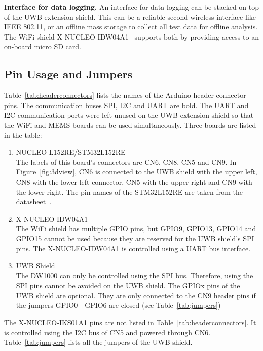 \documentclass[journal,comsoc]{IEEEtran}
\begin{document}
\vspace*{0.5em}
\noindent\textbf{Interface for data logging.} An interface for data logging can be stacked on top of the UWB extension shield. 
This can be a reliable second wireless interface like IEEE 802.11, or an offline mass storage to collect all test data for offline analysis. 
The WiFi shield X-NUCLEO-IDW04A1~\cite{wifiboard} supports both by providing access to an on-board micro SD card. 


\subsection{Pin Usage and Jumpers}
\label{subsec:pinusagejumpers}
Table~\ref{tab:headerconnectors} lists the names of the Arduino header connector pins. 
The communication buses SPI, I2C and UART are bold. 
The UART and I2C communication ports were left unused on the UWB extension shield so that the WiFi and MEMS boards can be used simultaneously. 
Three boards are listed in the table:
\begin{enumerate}
	\item NUCLEO-L152RE/STM32L152RE\\
	The labels of this board's connectors are CN6, CN8, CN5 and CN9. 
	In Figure~\ref{fig:3dview}, CN6 is connected to the UWB shield with the upper left, CN8 with the lower left connector, CN5 with the upper right and CN9  with the lower right.
	The pin names of the STM32L152RE are taken from the datasheet~\cite{stm32ds}.
	
	\item X-NUCLEO-IDW04A1\\
	The WiFi shield has multiple GPIO pins, but GPIO9, GPIO13, GPIO14 and GPIO15 cannot be used because they are reserved for the UWB shield's SPI pins.
	The X-NUCLEO-IDW04A1 is controlled using a UART bus interface.
	
	\item UWB Shield\\
	The DW1000 can only be controlled using the SPI bus.
	Therefore, using the SPI pins cannot be avoided on the UWB shield.
	The GPIOx pins of the UWB shield are optional.
	They are only connected to the CN9 header pins if the jumpers GPIO0 - GPIO6 are closed (see Table~\ref{tab:jumpers})
\end{enumerate}
The X-NUCLEO-IKS01A1 pins are not listed in Table~\ref{tab:headerconnectors}.
It is controlled using the I2C bus of CN5 and powered through CN6. %
Table~\ref{tab:jumpers} lists all the jumpers of the UWB shield.
\end{document}
